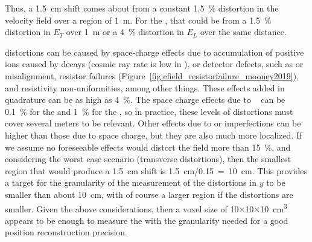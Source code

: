 Thus, a \SI{1.5}{\cm} shift comes about from a constant \SI{1.5}{\%} distortion in the velocity field over a region of \SI{1}{\m}. For the \efield, that could be from a \SI{1.5}{\%} distortion in $E_T$ over \SI{1}{\m} or a \SI{4}{\%} distortion in $E_L$ over the same distance.

\efield distortions can be caused by space-charge effects due to accumulation of positive ions caused by  decays (cosmic ray rate is low in ), or detector defects, such as  or  misalignment,  resistor failures (Figure~\ref{fig:efield_resistorfailure_mooney2019}), and resistivity non-uniformities, among other things.
These effects added in quadrature can be as high as \SI{4}{\%}. 
The space charge effects due to ~\cite{bib:mooney2018} can be \SI{0.1}{\%} for the  and \SI{1}{\%} for the , so in practice, these levels of 
distortions must cover several meters to be relevant.
Other effects due to  or  imperfections can be higher than those due to space charge, but they are also much more localized. If we assume no foreseeable effects would distort the field more than \SI{15}{\%}, and considering the worst case scenario (transverse distortions), then the smallest region that would produce a \SI{1.5}{\cm} shift is \SI{1.5}{\cm}/\num{0.15}~=~\SI{10}{\cm}. This provides a target for the granularity of the measurement of the \efield distortions in $y$ to be smaller than about \SI{10}{\cm}, with of course a larger region if the distortions are smaller. Given the above considerations, then a voxel size of \num{10}$\times$\num{10}$\times$\SI{10}{\cubic\cm} appears to be enough to measure the \efield with the granularity needed for a good position reconstruction precision. 



\begin{comment}
\begin{dunetable}
[Calibration Requirements]
{p{0.5\textwidth}p{0.15\textwidth}p{0.15\textwidth}}
{tab:calibreq}
{Calibration Specifications and Goals}   
Requirement & Specification & Goal \\ \toprowrule
\efield measurement precision & < 1\% & ALARA \\ \colhline
\efield measurement coverage & > 93\% & AHARA \\ \colhline
\efield measurement granularity & < 10x10x10 cm & ALARA \\ \colhline
\end{dunetable}
\end{comment}

